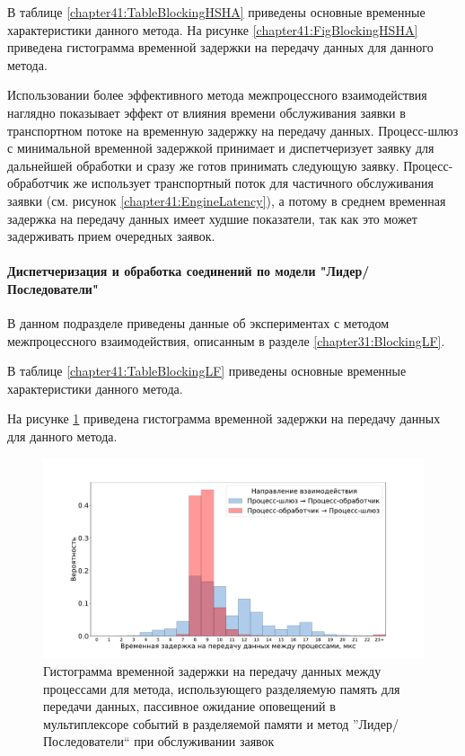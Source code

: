 В таблице \ref{chapter41:TableBlockingHSHA} приведены основные временные характеристики данного метода. На рисунке \ref{chapter41:FigBlockingHSHA} приведена гистограмма временной задержки на передачу данных для данного метода.

Использовании более эффективного метода межпроцессного взаимодействия наглядно показывает эффект от влияния времени обслуживания заявки в транспортном потоке на временную задержку на передачу данных. Процесс-шлюз с минимальной временной задержкой принимает и диспетчеризует заявку для дальнейшей обработки и сразу же готов принимать следующую заявку. Процесс-обработчик же использует транспортный поток для частичного обслуживания заявки (см. рисунок \ref{chapter41:EngineLatency}), а потому в среднем временная задержка на передачу данных имеет худшие показатели, так как это может задерживать прием очередных заявок.

\paragraph{Диспетчеризация и обработка соединений по модели "Лидер/Последователи"}

В данном подразделе приведены данные об экспериментах с методом межпроцессного взаимодействия, описанным в разделе \ref{chapter31:BlockingLF}.

В таблице \ref{chapter41:TableBlockingLF} приведены основные временные характеристики данного метода.

На рисунке \ref{chapter41:FigBlockingLF} приведена гистограмма временной задержки на передачу данных для данного метода.

\begin{figure}[!h]
\caption{Гистограмма временной задержки на передачу данных между процессами для метода, использующего разделяемую память для передачи данных, пассивное ожидание оповещений в мультиплексоре событий в разделяемой памяти и метод ''Лидер/Последователи`` при обслуживании заявок}
\label{chapter41:FigBlockingLF}
\includegraphics[width=\textwidth]{../../graphics/hist/BlockingLF}
\end{figure}

